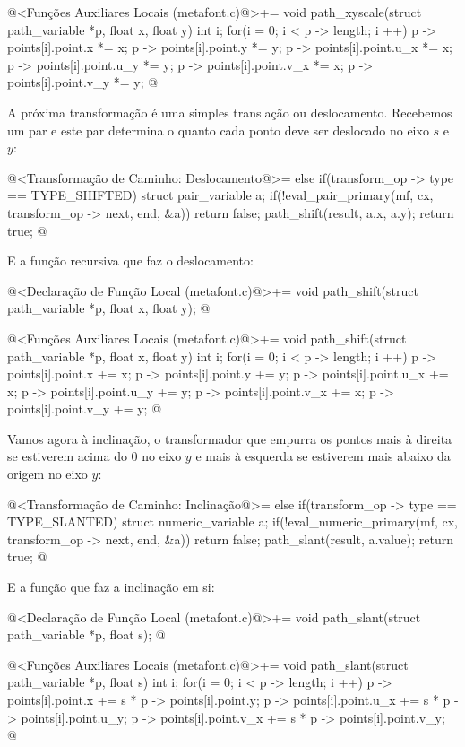 {{{{{{\iniciocodigo
@<Funções Auxiliares Locais (metafont.c)@>+=
void path_xyscale(struct path_variable *p, float x, float y){
  int i;
  for(i = 0; i < p -> length; i ++){
    p -> points[i].point.x *= x;
    p -> points[i].point.y *= y;
    p -> points[i].point.u_x *= x;
    p -> points[i].point.u_y *= y;
    p -> points[i].point.v_x *= x;
    p -> points[i].point.v_y *= y;
  }
}
@
\fimcodigo

A próxima transformação é uma simples translação ou
deslocamento. Recebemos um par e este par determina o quanto cada
ponto deve ser deslocado no eixo $s$ e $y$:

\iniciocodigo
@<Transformação de Caminho: Deslocamento@>=
else if(transform_op -> type == TYPE_SHIFTED){
  struct pair_variable a;
  if(!eval_pair_primary(mf, cx, transform_op -> next, end, &a))
    return false;
  path_shift(result, a.x, a.y);  
  return true;
}
@
\fimcodigo

E a função recursiva que faz o deslocamento:

\iniciocodigo
@<Declaração de Função Local (metafont.c)@>+=
void path_shift(struct path_variable *p, float x, float y);
@
\fimcodigo

\iniciocodigo
@<Funções Auxiliares Locais (metafont.c)@>+=
void path_shift(struct path_variable *p, float x, float y){
  int i;
  for(i = 0; i < p -> length; i ++){
    p -> points[i].point.x += x;
    p -> points[i].point.y += y;
    p -> points[i].point.u_x += x;
    p -> points[i].point.u_y += y;
    p -> points[i].point.v_x += x;
    p -> points[i].point.v_y += y;
  }
}
@
\fimcodigo

Vamos agora à inclinação, o transformador que empurra os pontos mais à
direita se estiverem acima do 0 no eixo $y$ e mais à esquerda se
estiverem mais abaixo da origem no eixo $y$:

\iniciocodigo
@<Transformação de Caminho: Inclinação@>=
else if(transform_op -> type == TYPE_SLANTED){
  struct numeric_variable a;
  if(!eval_numeric_primary(mf, cx, transform_op -> next, end, &a))
    return false;
  path_slant(result, a.value);  
  return true;
}
@
\fimcodigo

E a função que faz a inclinação em si:

\iniciocodigo
@<Declaração de Função Local (metafont.c)@>+=
void path_slant(struct path_variable *p, float s);
@
\fimcodigo

\iniciocodigo
@<Funções Auxiliares Locais (metafont.c)@>+=
void path_slant(struct path_variable *p, float s){
  int i;
  for(i = 0; i < p -> length; i ++){
    p -> points[i].point.x += s * p -> points[i].point.y;
    p -> points[i].point.u_x += s * p -> points[i].point.u_y;
    p -> points[i].point.v_x += s * p -> points[i].point.v_y;
  }
}
@
\fimcodigo

}}}}}}
